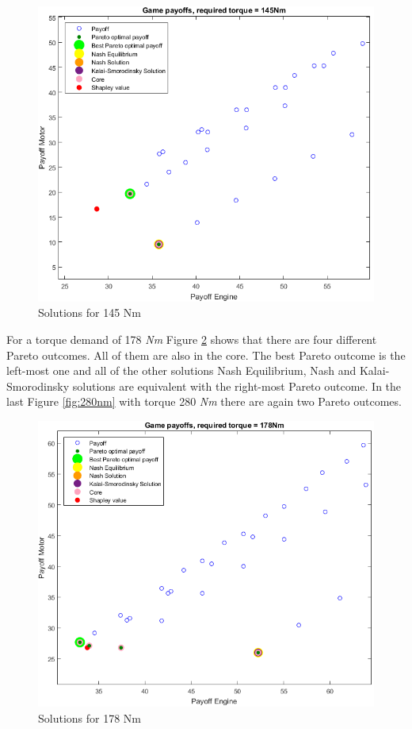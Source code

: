 \begin{figure}[h]
	\centering
	\includegraphics[scale=0.59]{figures/gametheory/145nm}
  	\caption{Solutions for 145 Nm}
  	\label{fig:145nm}
\end{figure}


For a torque demand of 178 \textit{Nm} Figure \ref{fig:178nm} shows that there are four different Pareto outcomes. All of them are also in the core. The best Pareto outcome is the left-most one and all of the other solutions Nash Equilibrium, Nash and Kalai-Smorodinsky solutions are equivalent with the right-most Pareto outcome. In the last Figure \ref{fig:280nm} with torque 280 \textit{Nm} there are again two Pareto outcomes.

\begin{figure}[h]
 	\centering
	\includegraphics[scale=0.57]{figures/gametheory/178nm}
	\caption{Solutions for 178 Nm}
	\label{fig:178nm}
\end{figure}

